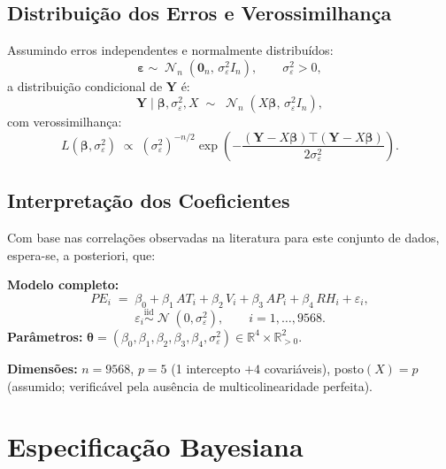 \documentclass[12pt, a4paper]{article}
\newcommand{\T}{{\top}}
\newcommand{\mY}{\mathbf{Y}}
\newcommand{\mb}{\boldsymbol{\beta}}
\newcommand{\beps}{\boldsymbol{\varepsilon}}
\DeclareMathOperator{\Normal}{\mathcal{N}}
\newcommand{\sig}{\sigma^{2}_{\varepsilon}}
\begin{document}
\subsection*{Distribuição dos Erros e Verossimilhança}
 
Assumindo erros independentes e normalmente distribuídos:
\[
  \beps \sim \Normal_{n}(\mathbf{0}_n,\, \sig I_n),
  \qquad \sig > 0,
\]
a distribuição condicional de $\mY$ é:
\begin{equation}
  \mY \mid \mb, \sig, X \;\sim\; \Normal_{n}(X\mb,\, \sig I_n),
  \label{eq:likelihood_dist}
\end{equation}
com verossimilhança:
\begin{equation}
  L(\mb, \sig) \;\propto\;
  (\sig)^{-n/2}
  \exp\!\left(
    -\frac{(\mY - X\mb)\T(\mY - X\mb)}{2\sig}
  \right).
  \label{eq:vero}
\end{equation}

\newpage
\subsection*{Interpretação dos Coeficientes}
 
Com base nas correlações observadas na literatura para este conjunto de dados,
espera-se, a posteriori, que:
 
 
\begin{modelbox}
\textbf{Modelo completo:}
\[
  PE_i \;=\; \beta_0 + \beta_1\,AT_i + \beta_2\,V_i
            + \beta_3\,AP_i + \beta_4\,RH_i + \varepsilon_i,
\]
\[
  \varepsilon_i \overset{\mathrm{iid}}{\sim} \Normal(0, \sig),
  \qquad i = 1, \ldots, 9568.
\]
\textbf{Parâmetros:}
$\boldsymbol{\theta} = (\beta_0, \beta_1, \beta_2, \beta_3, \beta_4, \sig) \in \mathbb{R}^4 \times \mathbb{R}_{>0}^2$.
 
\medskip
\textbf{Dimensões:} $n = 9568$, $p = 5$
(1 intercepto $+ 4$ covariáveis), posto$(X) = p$
(assumido; verificável pela ausência de multicolinearidade perfeita).
\end{modelbox}
 
\section*{Especificação Bayesiana}
 
\end{document}
